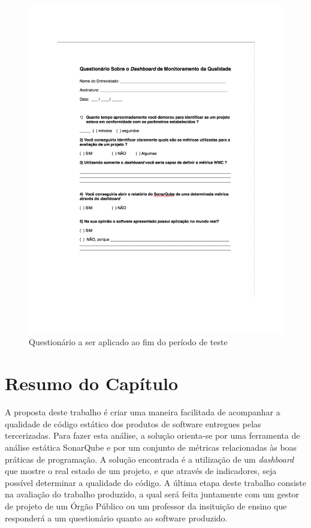 \graphicspath{{figuras/}}
\begin{figure}[h!]
\centering
\includegraphics[scale=1.00]{questionario}
\caption{Questionário a ser aplicado ao fim do período de teste}
\label{img:questionario}
\end{figure}

\section{Resumo do Capítulo}
A proposta deste trabalho é criar uma maneira facilitada de acompanhar a qualidade de código estático dos produtos de software entregues pelas tercerizadas. Para fazer esta análise, a solução orienta-se por uma ferramenta de análise estática SonarQube e por um conjunto de métricas relacionadas às boas práticas de programação. A solução encontrada é a utilização de um \textit{dashboard} que mostre o real estado de um projeto, e que através de indicadores, seja possível determinar a qualidade do código. A última etapa deste trabalho consiste na avaliação do trabalho produzido, a qual será feita juntamente com um gestor de projeto de um Órgão Público ou um professor da insituição de ensino que responderá a um questionário quanto ao software produzido.